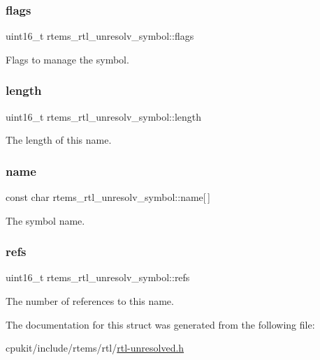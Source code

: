\subsubsection{\texorpdfstring{flags}{flags}}
{\footnotesize\ttfamily uint16\+\_\+t rtems\+\_\+rtl\+\_\+unresolv\+\_\+symbol\+::flags}

Flags to manage the symbol. \mbox{\label{structrtems__rtl__unresolv__symbol_a3a64b5936bd762948779a30e3048f757}} 
\subsubsection{\texorpdfstring{length}{length}}
{\footnotesize\ttfamily uint16\+\_\+t rtems\+\_\+rtl\+\_\+unresolv\+\_\+symbol\+::length}

The length of this name. \mbox{\label{structrtems__rtl__unresolv__symbol_adf138f38ded443fdda7989c3f3494714}} 
\subsubsection{\texorpdfstring{name}{name}}
{\footnotesize\ttfamily const char rtems\+\_\+rtl\+\_\+unresolv\+\_\+symbol\+::name\mbox{[}$\,$\mbox{]}}

The symbol name. \mbox{\label{structrtems__rtl__unresolv__symbol_a5704e7d1e1bd5dbd0d073231616aabdc}} 
\subsubsection{\texorpdfstring{refs}{refs}}
{\footnotesize\ttfamily uint16\+\_\+t rtems\+\_\+rtl\+\_\+unresolv\+\_\+symbol\+::refs}

The number of references to this name. 

The documentation for this struct was generated from the following file\+:\begin{DoxyCompactItemize}
\item 
cpukit/include/rtems/rtl/\mbox{\hyperlink{rtl-unresolved_8h}{rtl-\/unresolved.\+h}}\end{DoxyCompactItemize}
